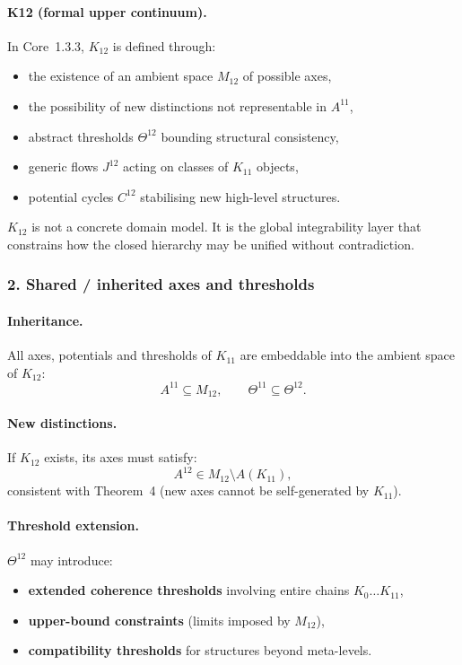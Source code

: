 \paragraph{K12 (formal upper continuum).}
In Core~1.3.3, $K_{12}$ is defined through:
\begin{itemize}
  \item the existence of an ambient space $M_{12}$ of possible axes,
  \item the possibility of new distinctions not representable in $A^{11}$,
  \item abstract thresholds $\Theta^{12}$ bounding structural consistency,
  \item generic flows $J^{12}$ acting on classes of $K_{11}$ objects,
  \item potential cycles $C^{12}$ stabilising new high-level structures.
\end{itemize}

$K_{12}$ is not a concrete domain model. It is the global integrability layer
that constrains how the closed hierarchy may be unified without contradiction.

\subsubsection{2. Shared / inherited axes and thresholds}

\paragraph{Inheritance.}
All axes, potentials and thresholds of $K_{11}$ are embeddable into the
ambient space of $K_{12}$:
\[
A^{11} \subseteq M_{12}, \qquad
\Theta^{11} \subseteq \Theta^{12}.
\]

\paragraph{New distinctions.}
If $K_{12}$ exists, its axes must satisfy:
\[
A^{12} \in M_{12} \setminus A(K_{11}),
\]
consistent with Theorem~4 (new axes cannot be self-generated by $K_{11}$).

\paragraph{Threshold extension.}
$\Theta^{12}$ may introduce:
\begin{itemize}
  \item \textbf{extended coherence thresholds} involving entire chains
        $K_0\dots K_{11}$,
  \item \textbf{upper-bound constraints} (limits imposed by $M_{12}$),
  \item \textbf{compatibility thresholds} for structures beyond meta-levels.
\end{itemize}

